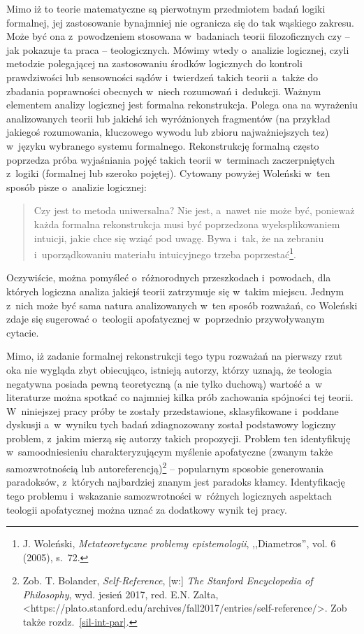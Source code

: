 Mimo iż to teorie matematyczne są pierwotnym przedmiotem badań logiki formalnej, jej zastosowanie bynajmniej nie ogranicza się do tak wąskiego zakresu. Może być ona z~powodzeniem stosowana w~badaniach teorii filozoficznych czy -- jak pokazuje ta praca -- teologicznych. Mówimy wtedy o~analizie logicznej, czyli metodzie polegającej na zastosowaniu środków logicznych do kontroli prawdziwości lub sensowności sądów i~twierdzeń takich teorii a~także do zbadania poprawności obecnych w~niech rozumowań i~dedukcji. Ważnym elementem analizy logicznej jest formalna rekonstrukcja. Polega ona na wyrażeniu analizowanych teorii lub jakichś ich wyróżnionych fragmentów (na przykład jakiegoś rozumowania, kluczowego wywodu lub zbioru najważniejszych tez) w~języku wybranego systemu formalnego. Rekonstrukcję formalną często poprzedza próba wyjaśniania pojęć takich teorii w~terminach zaczerpniętych z~logiki (formalnej lub szeroko pojętej). Cytowany powyżej Woleński w~ten sposób pisze o~analizie logicznej:

\begin{quote}
Czy jest to metoda uniwersalna? Nie jest, a~nawet nie może być, ponieważ każda formalna rekonstrukcja musi być poprzedzona wyeksplikowaniem intuicji, jakie chce się wziąć pod uwagę. Bywa i~tak, że na zebraniu i~uporządkowaniu materiału intuicyjnego trzeba poprzestać\footnote{J. Woleński, \textit{Metateoretyczne problemy epistemologii}, ,,Diametros'', vol. 6 (2005), s.~72.}.
\end{quote}
Oczywiście, można pomyśleć o~różnorodnych przeszkodach i~powodach, dla których logiczna analiza jakiejś teorii zatrzymuje się w~takim miejscu. Jednym z~nich może być sama natura analizowanych w~ten sposób rozważań, co Woleński zdaje się sugerować o~teologii apofatycznej w~poprzednio przywoływanym cytacie.

Mimo, iż zadanie formalnej rekonstrukcji tego typu rozważań na pierwszy rzut oka nie wygląda zbyt obiecująco, istnieją autorzy, którzy uznają, że teologia negatywna posiada pewną teoretyczną (a nie tylko duchową) wartość a~w literaturze można spotkać co najmniej kilka prób zachowania spójności tej teorii. W~niniejszej pracy próby te zostały przedstawione, sklasyfikowane i~poddane dyskusji a~w~wyniku tych badań zdiagnozowany został podstawowy logiczny problem, z~jakim mierzą się autorzy takich propozycji. Problem ten identyfikuję w~samoodniesieniu charakteryzującym myślenie apofatyczne (zwanym także samozwrotnością lub autoreferencją)\footnote{Zob. T. Bolander, \textit{Self-Reference}, [w:] \textit{The Stanford Encyclopedia of Philosophy}, wyd. jesień 2017, red. E.N. Zalta, {\textless}https://plato.stanford.edu/archives/fall2017/entries/self-reference/{\textgreater}. Zob także rozdz.~\ref{sil-int-par}.} -- popularnym sposobie generowania paradoksów, z~których najbardziej znanym jest paradoks kłamcy. Identyfikację tego problemu i~wskazanie samozwrotności w~różnych logicznych aspektach teologii apofatycznej można uznać za dodatkowy wynik tej pracy.

